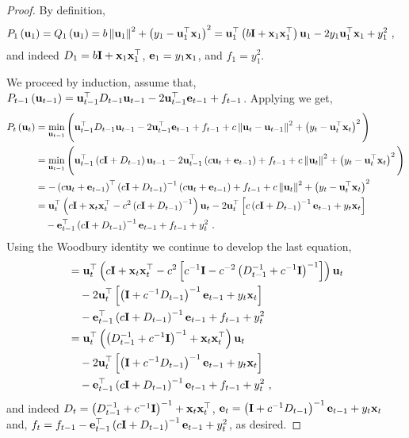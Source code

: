 \begin{proof}
By definition,
\begin{align*}
P_{1}\left(\mathbf{u}_{1}\right) & = Q_{1}\left(\mathbf{u}_{1}\right)
 = b\left\Vert \mathbf{u}_{1}\right\Vert ^{2}+\left(y_{1}-{\mathbf{u}}^{\top}_{1}\mathbf{x}_{1}\right)^{2}
 ={\mathbf{u}}^{\top}_{1}\left(b\mathbf{I}+\mathbf{x}_{1}{\mathbf{x}}^{\top}_{1}\right)\mathbf{u}_{1}-2y_{1}{\mathbf{u}}^{\top}_{1}\mathbf{x}_{1}+y_{1}^{2} ~,
\end{align*}
and indeed
\(
D_{1}=b\mathbf{I}+\mathbf{x}_{1}{\mathbf{x}}^{\top}_{1}
\),
\(
\mathbf{e}_{1}=y_{1}\mathbf{x}_{1}
\), and
\(
f_{1}=y_{1}^{2}
\).

We proceed by induction, assume that,
\(
P_{t-1}\left(\mathbf{u}_{t-1}\right)={\mathbf{u}}^{\top}_{t-1}D_{t-1}\mathbf{u}_{t-1}-2{\mathbf{u}}^{\top}_{t-1}\mathbf{e}_{t-1}+f_{t-1}
\).
Applying  we get,
\begin{align*}
P_{t}\left(\mathbf{u}_{t}\right) &= \min_{\mathbf{u}_{t-1}}\Bigg({\mathbf{u}}^{\top}_{t-1}D_{t-1}\mathbf{u}_{t-1}-2{\mathbf{u}}^{\top}_{t-1}\mathbf{e}_{t-1}+f_{t-1}+c\left\Vert \mathbf{u}_{t}-\mathbf{u}_{t-1}\right\Vert ^{2}+\left(y_{t}-{\mathbf{u}}^{\top}_{t}\mathbf{x}_{t}\right)^{2}\Bigg)\\
&  = \min_{\mathbf{u}_{t-1}}\Bigg({\mathbf{u}}^{\top}_{t-1}\left(c\mathbf{I}+D_{t-1}\right)\mathbf{u}_{t-1}-2{\mathbf{u}}^{\top}_{t-1}
\left(c\mathbf{u}_{t}+\mathbf{e}_{t-1}\right) +f_{t-1}+c\left\Vert \mathbf{u}_{t}\right\Vert ^{2}+\left(y_{t}-{\mathbf{u}}^{\top}_{t}\mathbf{x}_{t}\right)^{2}\Bigg)\\
&  =  -\left(c\mathbf{u}_{t}+\mathbf{e}_{t-1}\right)^{\top}\left(c\mathbf{I}+D_{t-1}\right)^{-1}\left(c\mathbf{u}_{t}+\mathbf{e}_{t-1}\right)
+f_{t-1}+c\left\Vert \mathbf{u}_{t}\right\Vert ^{2}+\left(y_{t}-{\mathbf{u}}^{\top}_{t}\mathbf{x}_{t}\right)^{2}\\
&  = {\mathbf{u}}^{\top}_{t}\left(c\mathbf{I}+\mathbf{x}_{t}{\mathbf{x}}^{\top}_{t}-c^{2}\left(c\mathbf{I}+D_{t-1}\right)^{-1}\right)\mathbf{u}_{t}-2{\mathbf{u}}^{\top}_{t}\left[c\left(c\mathbf{I}+D_{t-1}\right)^{-1}\mathbf{e}_{t-1}+y_{t}\mathbf{x}_{t}\right]\\
& \quad -\mathbf{e}^{\top}_{t-1}
 \left(c\mathbf{I}+D_{t-1}\right)^{-1}\mathbf{e}_{t-1}+f_{t-1}+y_{t}^{2}~.
\end{align*}
Using the Woodbury identity we continue to develop the last equation,
\begin{align*}
& = {\mathbf{u}}^{\top}_{t}\left(c\mathbf{I}+\mathbf{x}_{t}{\mathbf{x}}^{\top}_{t}-c^{2}\left[c^{-1}\mathbf{I}-c^{-2}\left(D_{t-1}^{-1}+c^{-1}
\mathbf{I}\right)^{-1}\right]\right)\mathbf{u}_{t}\\
 & \quad  -2{\mathbf{u}}^{\top}_{t}\left[\left(\mathbf{I}+c^{-1}D_{t-1}\right)^{-1}\mathbf{e}_{t-1}+y_{t}\mathbf{x}_{t}\right]\\
 & \quad -\mathbf{e}^{\top}_{t-1}
 \left(c\mathbf{I}+D_{t-1}\right)^{-1}\mathbf{e}_{t-1}+f_{t-1}+y_{t}^{2}\\
 & =  {\mathbf{u}}^{\top}_{t}\left(\left(D_{t-1}^{-1}+c^{-1}\mathbf{I}\right)^{-1}+\mathbf{x}_{t}{\mathbf{x}}^{\top}_{t}\right)\mathbf{u}_{t}\\
 & \quad -2{\mathbf{u}}^{\top}_{t}\left[\left(\mathbf{I}+c^{-1}D_{t-1}\right)^{-1}\mathbf{e}_{t-1}+y_{t}\mathbf{x}_{t}\right]\\
 & \quad -\mathbf{e}^{\top}_{t-1}
 \left(c\mathbf{I}+D_{t-1}\right)^{-1}\mathbf{e}_{t-1}+f_{t-1}+y_{t}^{2}~,
\end{align*}
and indeed
$
D_{t}=\left(D_{t-1}^{-1}+c^{-1}\mathbf{I}\right)^{-1}+\mathbf{x}_{t}{\mathbf{x}}^{\top}_{t}
$,
$
\mathbf{e}_{t}=\left(\mathbf{I}+c^{-1}D_{t-1}\right)^{-1}\mathbf{e}_{t-1}+y_{t}\mathbf{x}_{t}
$ and,
$
f_{t}=f_{t-1}-\mathbf{e}^{\top}_{t-1}\left(c\mathbf{I}+D_{t-1}\right)^{-1}\mathbf{e}_{t-1}+y_{t}^{2}
$, as desired.
\QED
\end{proof}

